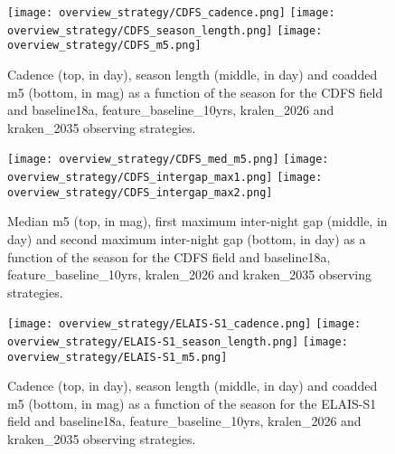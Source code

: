 

\begin{figure}[!htbp]
\begin{center}
  \texttt{[image: overview\_strategy/CDFS\_cadence.png]}
  \texttt{[image: overview\_strategy/CDFS\_season\_length.png]}
  \texttt{[image: overview\_strategy/CDFS\_m5.png]}
 \caption{Cadence (top, in day), season length (middle, in day) and coadded m5 (bottom, in mag) as a function of the season for the CDFS field and baseline18a, feature\_baseline\_10yrs, kralen\_2026 and kraken\_2035 observing strategies.}\label{fig:cdfs_cad}
\end{center}
\end{figure}

\begin{figure}[!htbp]
\begin{center}
  
  \texttt{[image: overview\_strategy/CDFS\_med\_m5.png]}
  \texttt{[image: overview\_strategy/CDFS\_intergap\_max1.png]}
    \texttt{[image: overview\_strategy/CDFS\_intergap\_max2.png]}
 \caption{Median m5 (top, in mag), first maximum inter-night gap (middle, in day) and second maximum inter-night gap (bottom, in day)  as a function of the season for the CDFS field and baseline18a, feature\_baseline\_10yrs, kralen\_2026 and kraken\_2035 observing strategies.}\label{fig:cdfs_m5}
\end{center}
\end{figure}




\begin{figure}[!htbp]
\begin{center}
  \texttt{[image: overview\_strategy/ELAIS-S1\_cadence.png]}
  \texttt{[image: overview\_strategy/ELAIS-S1\_season\_length.png]}
  \texttt{[image: overview\_strategy/ELAIS-S1\_m5.png]}
 \caption{Cadence (top, in day), season length (middle, in day) and coadded m5 (bottom, in mag) as a function of the season for the ELAIS-S1 field and baseline18a, feature\_baseline\_10yrs, kralen\_2026 and kraken\_2035 observing strategies.}\label{fig:elais-s1_cad}
\end{center}
\end{figure}

